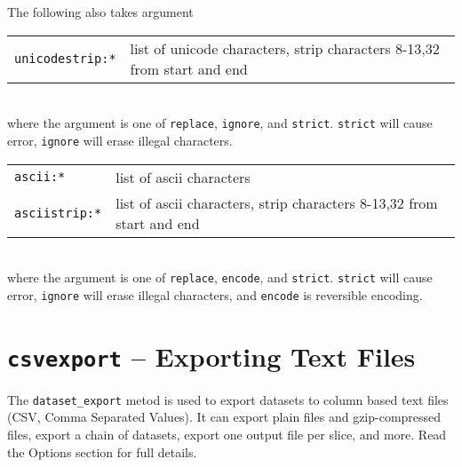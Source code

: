 \noindent The following also takes argument\\

\begin{tabular}{ll}
  \texttt{unicodestrip:*}  & list of unicode characters, strip characters 8-13,32 from start and end\\
\end{tabular}\\

\noindent where the argument is one of \texttt{replace}, \texttt{ignore}, and \texttt{strict}.
\texttt{strict} will cause error, \texttt{ignore} will erase illegal characters.\\

\begin{tabular}{ll}
  \texttt{ascii:*}      & list of ascii characters\\
  \texttt{asciistrip:*} & list of ascii characters, strip characters 8-13,32 from start and end\\
\end{tabular}\\

\noindent where the argument is one of \texttt{replace}, \texttt{encode}, and \texttt{strict}.
\texttt{strict} will cause error, \texttt{ignore} will erase illegal characters,
and \texttt{encode} is reversible encoding.





\clearpage
\section{\texttt{csvexport} -- Exporting Text Files}

The \texttt{dataset\_export} metod is used to export datasets to
column based text files (CSV, Comma Separated Values).  It can export
plain files and gzip-compressed files, export a chain of datasets,
export one output file per slice, and more.  Read the Options section
for full details.

